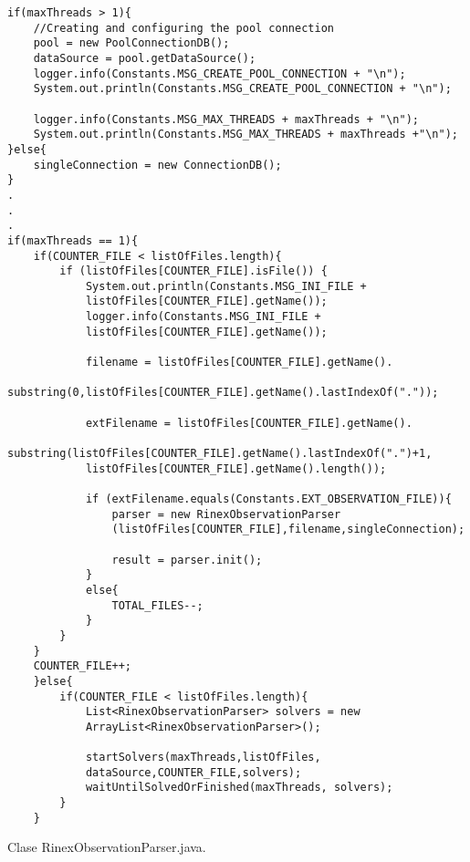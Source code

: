 \begin{lstlisting}
if(maxThreads > 1){
	//Creating and configuring the pool connection
	pool = new PoolConnectionDB();
	dataSource = pool.getDataSource();
	logger.info(Constants.MSG_CREATE_POOL_CONNECTION + "\n");
	System.out.println(Constants.MSG_CREATE_POOL_CONNECTION + "\n");

	logger.info(Constants.MSG_MAX_THREADS + maxThreads + "\n");
	System.out.println(Constants.MSG_MAX_THREADS + maxThreads +"\n");
}else{
	singleConnection = new ConnectionDB();
}
.
.
.
if(maxThreads == 1){
	if(COUNTER_FILE < listOfFiles.length){
		if (listOfFiles[COUNTER_FILE].isFile()) {
			System.out.println(Constants.MSG_INI_FILE + 	
			listOfFiles[COUNTER_FILE].getName());
			logger.info(Constants.MSG_INI_FILE + 
			listOfFiles[COUNTER_FILE].getName());

			filename = listOfFiles[COUNTER_FILE].getName().
			substring(0,listOfFiles[COUNTER_FILE].getName().lastIndexOf("."));
			
			extFilename = listOfFiles[COUNTER_FILE].getName().
			substring(listOfFiles[COUNTER_FILE].getName().lastIndexOf(".")+1, 	 
			listOfFiles[COUNTER_FILE].getName().length());

			if (extFilename.equals(Constants.EXT_OBSERVATION_FILE)){
				parser = new RinexObservationParser
				(listOfFiles[COUNTER_FILE],filename,singleConnection);

				result = parser.init();
			}
			else{
				TOTAL_FILES--;
			}
		}
	}
	COUNTER_FILE++;
	}else{
		if(COUNTER_FILE < listOfFiles.length){
			List<RinexObservationParser> solvers = new 
			ArrayList<RinexObservationParser>();

			startSolvers(maxThreads,listOfFiles,
			dataSource,COUNTER_FILE,solvers);
			waitUntilSolvedOrFinished(maxThreads, solvers);
		}
	}
\end{lstlisting}

Clase RinexObservationParser.java. \\


